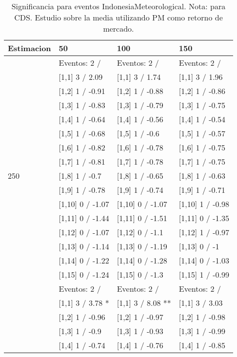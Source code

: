 \begin{table}

\caption{Significancia para eventos IndonesiaMeteorological. Nota: para CDS. Estudio sobre la media utilizando PM como retorno de mercado.}
\centering
\begin{tabular}[t]{llll}
\toprule
Estimacion & 50 & 100 & 150\\
\midrule
 & Eventos:  2 / & Eventos:  2 / & Eventos:  2 /\\
 & {}[1,1] 3  / 2.09 & {}[1,1] 3  / 1.74 & {}[1,1] 3  / 1.96\\
 & {}[1,2] 1  / -0.91 & {}[1,2] 1  / -0.88 & {}[1,2] 1  / -0.86\\
 & {}[1,3] 1  / -0.83 & {}[1,3] 1  / -0.79 & {}[1,3] 1  / -0.75\\
 & {}[1,4] 1  / -0.64 & {}[1,4] 1  / -0.56 & {}[1,4] 1  / -0.54\\
\addlinespace
 & {}[1,5] 1  / -0.68 & {}[1,5] 1  / -0.6 & {}[1,5] 1  / -0.57\\
 & {}[1,6] 1  / -0.82 & {}[1,6] 1  / -0.78 & {}[1,6] 1  / -0.75\\
 & {}[1,7] 1  / -0.81 & {}[1,7] 1  / -0.78 & {}[1,7] 1  / -0.75\\
250 & {}[1,8] 1  / -0.7 & {}[1,8] 1  / -0.65 & {}[1,8] 1  / -0.63\\
 & {}[1,9] 1  / -0.78 & {}[1,9] 1  / -0.74 & {}[1,9] 1  / -0.71\\
\addlinespace
 & {}[1,10] 0  / -1.07 & {}[1,10] 0  / -1.07 & {}[1,10] 1  / -0.98\\
 & {}[1,11] 0  / -1.44 & {}[1,11] 0  / -1.51 & {}[1,11] 0  / -1.35\\
 & {}[1,12] 0  / -1.07 & {}[1,12] 0  / -1.1 & {}[1,12] 1  / -0.97\\
 & {}[1,13] 0  / -1.14 & {}[1,13] 0  / -1.19 & {}[1,13] 0  / -1\\
 & {}[1,14] 0  / -1.22 & {}[1,14] 0  / -1.28 & {}[1,14] 0  / -1.03\\
\addlinespace
 & {}[1,15] 0  / -1.24 & {}[1,15] 0  / -1.3 & {}[1,15] 1  / -0.99\\
 & Eventos:  2 / & Eventos:  2 / & Eventos:  2 /\\
 & {}[1,1] 3  / 3.78 * & {}[1,1] 3  / 8.08 ** & {}[1,1] 3  / 3.03\\
 & {}[1,2] 1  / -0.96 & {}[1,2] 1  / -0.97 & {}[1,2] 1  / -0.98\\
 & {}[1,3] 1  / -0.9 & {}[1,3] 1  / -0.93 & {}[1,3] 1  / -0.99\\
\addlinespace
 & {}[1,4] 1  / -0.74 & {}[1,4] 1  / -0.76 & {}[1,4] 1  / -0.85\\

\end{tabular}
\end{table}
